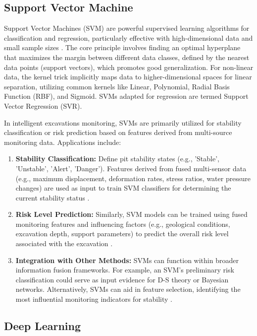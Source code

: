 \documentclass[preprint,11pt,authoryear,3p]{elsarticle}
\begin{document}
\subsection{Support Vector Machine}

Support Vector Machines (SVM) are powerful supervised learning algorithms for classification and regression, particularly effective with high-dimensional data and small sample sizes \citep{Murphy2022Intro}. The core principle involves finding an optimal hyperplane that maximizes the margin between different data classes, defined by the nearest data points (support vectors), which promotes good generalization. For non-linear data, the kernel trick implicitly maps data to higher-dimensional spaces for linear separation, utilizing common kernels like Linear, Polynomial, Radial Basis Function (RBF), and Sigmoid. SVMs adapted for regression are termed Support Vector Regression (SVR).

In intelligent excavations monitoring, SVMs are primarily utilized for stability classification or risk prediction based on features derived from multi-source monitoring data. Applications include:

\begin{enumerate}
    \item \textbf{Stability Classification:} Define pit stability states (e.g., 'Stable', 'Unstable', 'Alert', 'Danger'). Features derived from fused multi-sensor data (e.g., maximum displacement, deformation rates, stress ratios, water pressure changes) are used as input to train SVM classifiers for determining the current stability status \citep{LI20231019}.

    \item \textbf{Risk Level Prediction:} Similarly, SVM models can be trained using fused monitoring features and influencing factors (e.g., geological conditions, excavation depth, support parameters) to predict the overall risk level associated with the excavation \citep{PAN2024109578}.

    \item \textbf{Integration with Other Methods:} SVMs can function within broader information fusion frameworks. For example, an SVM's preliminary risk classification could serve as input evidence for D-S theory or Bayesian networks. Alternatively, SVMs can aid in feature selection, identifying the most influential monitoring indicators for stability \citep{WU2024105516}.
\end{enumerate}

\subsection{Deep Learning}
\end{document}

